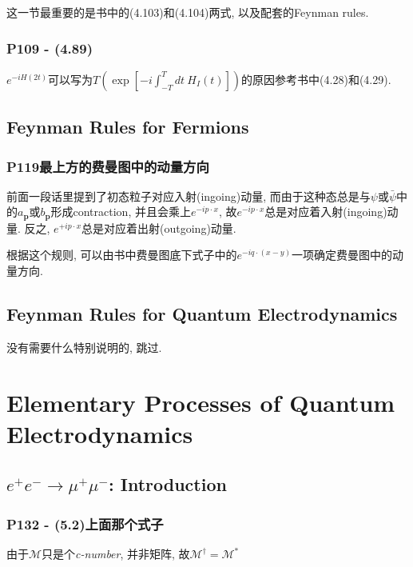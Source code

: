 \documentclass[10pt,b5paper,openany]{book}
\begin{document}
这一节最重要的是书中的(4.103)和(4.104)两式, 以及配套的Feynman rules. 

\subsection{P109 - (4.89)}

$e^{-iH(2t)}$可以写为$T(\exp[-i\int_{-T}^{T}dt\ H_I(t)])$的原因参考书中(4.28)和(4.29).

\section{Feynman Rules for Fermions}

\subsection{P119最上方的费曼图中的动量方向}

前面一段话里提到了初态粒子对应入射(ingoing)动量, 而由于这种态总是与$\psi$或$\bar{\psi}$中的$a_{\mathbf{p}}$或$b_{\mathbf{p}}$形成contraction, 并且会乘上$e^{-ip\cdot x}$, 故$e^{-ip\cdot x}$总是对应着入射(ingoing)动量. 反之, $e^{+ip\cdot x}$总是对应着出射(outgoing)动量. 

根据这个规则, 可以由书中费曼图底下式子中的$e^{-iq\cdot (x-y)}$一项确定费曼图中的动量方向. 

\section{Feynman Rules for Quantum Electrodynamics}
没有需要什么特别说明的, 跳过. 

\clearpage

\chapter{Elementary Processes of Quantum Electrodynamics}

\section{\texorpdfstring{$e^+e^- \rightarrow \mu^+\mu^-$}:: Introduction}

\subsection{P132 - (5.2)上面那个式子}

由于$\mathcal{M}$只是个\textit{c-number}, 并非矩阵, 故$\mathcal{M}^\dagger = \mathcal{M}^*$
\end{document}

